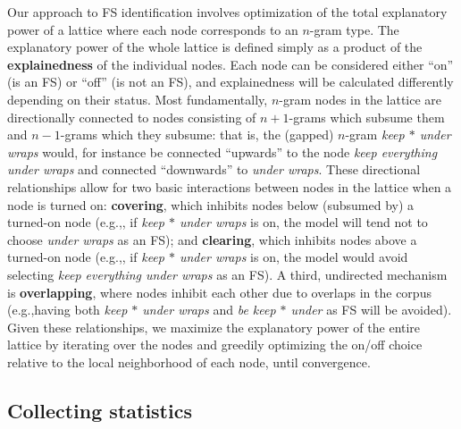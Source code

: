 \documentclass[11pt,letterpaper]{article}
\makeatletter
\def \eg {e.g.,\@ }
\newcommand{\gap}{$*$\xspace}
\newcommand{\ex}[1]{\textit{#1}\xspace}
\newcommand{\termdef}[1]{\textbf{#1}\xspace}
\makeatother
\begin{document}
Our approach to FS identification involves optimization of the total explanatory power of a lattice where each node corresponds to an $n$-gram type. The explanatory power of the whole lattice is defined simply as a product of the \termdef{explainedness} of the individual nodes. Each node can be considered either ``on'' (is an FS) or ``off'' (is not an FS), and explainedness will be calculated differently depending on their status. Most fundamentally, $n$-gram nodes in the lattice are directionally connected to nodes consisting of $n+1$-grams which subsume them and $n-1$-grams which they subsume: that is, the (gapped) $n$-gram \ex{keep \gap under wraps} would, for instance be connected ``upwards'' to the node \ex{keep everything under wraps} and connected ``downwards'' to \ex{under wraps}. These directional relationships allow for two basic interactions between nodes in the lattice when a node is turned on: \termdef{covering}, which inhibits nodes below (subsumed by) a turned-on node (\eg, if \ex{keep \gap under wraps} is on, the model will tend not to choose \ex{under wraps} as an FS); and \termdef{clearing}, which inhibits nodes above a turned-on node (\eg, if \ex{keep \gap under wraps} is on, the model would avoid selecting \ex{keep everything under wraps} as an FS). A third, undirected mechanism is \termdef{overlapping}, where nodes inhibit each other due to overlaps in the corpus (\eg having both \ex{keep \gap under wraps} and \ex{be keep \gap under} as FS will be avoided). Given these relationships, we maximize the explanatory power of the entire lattice by iterating over the nodes and greedily optimizing the on/off choice relative to the local neighborhood of each node, until convergence.

\subsection{Collecting statistics}
\end{document}
